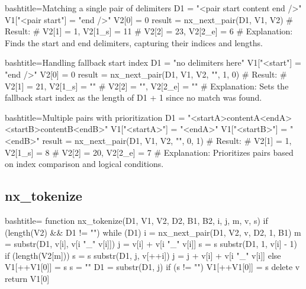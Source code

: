 \begin{NexCodeBox}{bash}{title={Matching a single pair of delimiters}}
	D1 = "<pair start content end />"
	V1["<pair start"] = "end />"
	V2[0] = 0
	result = nx_next_pair(D1, V1, V2)
	# Result:
	# V2[1] = 1, V2[1_s] = 11
	# V2[2] = 23, V2[2_e] = 6
	# Explanation: Finds the start and end delimiters, capturing their indices and lengths.
\end{NexCodeBox}

\begin{NexCodeBox}{bash}{title={Handling fallback start index}}
	D1 = "no delimiters here"
	V1["<start"] = "end />"
	V2[0] = 0
	result = nx_next_pair(D1, V1, V2, "", 1, 0)
	# Result:
	# V2[1] = 21, V2[1_s] = ""
	# V2[2] = "", V2[2_e] = ""
	# Explanation: Sets the fallback start index as the length of D1 + 1 since no match was found.
\end{NexCodeBox}

\begin{NexCodeBox}{bash}{title={Multiple pairs with prioritization}}
	D1 = "<startA>contentA<endA><startB>contentB<endB>"
	V1["<startA>"] = "<endA>"
	V1["<startB>"] = "<endB>"
	result = nx_next_pair(D1, V1, V2, "", 0, 1)
	# Result:
	# V2[1] = 1, V2[1_s] = 8
	# V2[2] = 20, V2[2_e] = 7
	# Explanation: Prioritizes pairs based on index comparison and logical conditions.
\end{NexCodeBox}

\newpage
\subsection{nx_tokenize}
\label{nx_tokenize}
\begin{NexCodeBox}{bash}{title={}}
function nx_tokenize(D1, V1, V2, D2, B1, B2, i, j, m, v, s) {
	if (length(V2) && D1 != "") {
		while (D1) {
			i = nx_next_pair(D1, V2, v, D2, 1, B1)
			m = substr(D1, v[i], v[i "_" v[i]])
			j = v[i] + v[i "_" v[i]]
			s = s substr(D1, 1, v[i] - 1)
			if (length(V2[m])) {
				s = s substr(D1, j, v[++i])
				j = j + v[i] + v[i "_" v[i]]
			} else {
				V1[++V1[0]] = s
				s = ""
			}
			D1 = substr(D1, j)
		}
		if (s != "")
			V1[++V1[0]] = s
		delete v
		return V1[0]
	}
}
\end{NexCodeBox}

